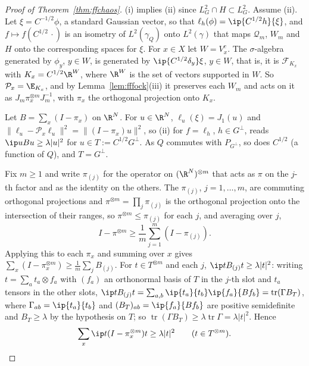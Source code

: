 \begin{proof}[Proof of Theorem~\ref{thm:ffchaos}]
(i) implies (ii) since $L^2_G\cap H\subset L^2_G$. Assume (ii). Let $\xi=
C^{-1/2}\phi$, a standard Gaussian vector, so that $\ell_h(\phi)=\ip{C^{1/2}
h}{\xi}$, and $f\mapsto f(C^{1/2}\,\cdot)$ is an isometry of $L^2(\gamma_Q)$
onto $L^2(\gamma)$ that maps $\mathcal Q_m$, $W_m$ and $H$ onto the
corresponding spaces for $\xi$. For $x\in X$ let $W=V_x^c$. The
$\sigma$-algebra generated by $\phi_y$, $y\in W$, is generated by $\ip{C^{1/2}
\delta_y}\xi$, $y\in W$, that is, it is $\mathcal F_{K_x}$ with $K_x=C^{1/2}
\R^W$, where $\R^W$ is the set of vectors supported in $W$. So $\mathcal P_x
=\E_{K_x}$, and by Lemma~\ref{lem:fffock}(iii) it preserves each $W_m$ and
acts on it as $J_m\pi_x^{\otimes m}J_m^{-1}$, with $\pi_x$ the orthogonal
projection onto $K_x$.

Let $B=\sum_x(I-\pi_x)$ on $\R^N$. For $u\in\R^N$, $\ell_u(\xi)=J_1(u)$ and
$\lVert\ell_u-\mathcal P_x\ell_u\rVert^2=\lVert(I-\pi_x)u\rVert^2$, so (ii)
for $f=\ell_h$, $h\in G^\perp$, reads $\ip u{Bu}\ge\lambda\lvert u\rvert^2$
for $u\in T:=C^{1/2}G^\perp$. As $Q$ commutes with $P_{G^\perp}$, so does $C^{1/2}$ (a function of
$Q$), and $T=G^\perp$.

Fix $m\ge1$ and write $\pi_{(j)}$ for the operator on $(\R^N)^{\otimes m}$
that acts as $\pi$ on the $j$-th factor and as the identity on the others.
The $\pi_{(j)}$, $j=1,\dots,m$, are commuting orthogonal projections and
$\pi^{\otimes m}=\prod_j\pi_{(j)}$ is the orthogonal projection onto the
intersection of their ranges, so $\pi^{\otimes m}\le\pi_{(j)}$ for each $j$,
and averaging over $j$,
\begin{equation}\label{eq:fftensor}
I-\pi^{\otimes m}\ge\frac1m\sum_{j=1}^m(I-\pi_{(j)}).
\end{equation}
Applying this to each $\pi_x$ and summing over $x$ gives $\sum_x(I-\pi_x^{
\otimes m})\ge\frac1m\sum_jB_{(j)}$. For $t\in T^{\otimes m}$ and each $j$,
$\ip t{B_{(j)}t}\ge\lambda\lvert t\rvert^2$: writing $t=\sum_{a}t_a\otimes
f_a$ with $(f_a)$ an orthonormal basis of $T$ in the $j$-th slot and $t_a$
tensors in the other slots, $\ip t{B_{(j)}t}=\sum_{a,b}\ip{t_a}{t_b}\ip{f_a}
{Bf_b}=\operatorname{tr}(\Gamma B_T)$, where $\Gamma_{ab}=\ip{t_a}{t_b}$ and
$(B_T)_{ab}=\ip{f_a}{Bf_b}$ are positive semidefinite and $B_T\ge\lambda$ by
the hypothesis on $T$; so $\operatorname{tr}(\Gamma B_T)\ge\lambda
\operatorname{tr}\Gamma=\lambda\lvert t\rvert^2$. Hence
\begin{equation}\label{eq:ffchaosm}
\sum_x\ip t{(I-\pi_x^{\otimes m})t}\ge\lambda\lvert t\rvert^2\qquad(t\in
T^{\otimes m}).
\end{equation}


\end{proof}
